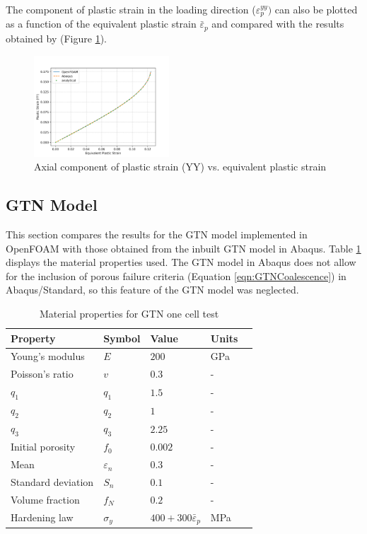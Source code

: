 \documentclass[sn-mathphys,Numbered]{sn-jnl}%
\begin{document}
\begin{appendices}
The component of plastic strain in the loading direction ($\varepsilon_p^{yy})$ can also be plotted as a function of the equivalent plastic strain ${\bar{\varepsilon}}_p$ and compared with the results obtained by \citet{doghri_numerical_1995} (Figure \ref{fig:lemaitre_one_element_ep}).
\begin{figure}[htbp]
\begin{center}
	\includegraphics[width=0.45\textwidth]{./figures/finiteVolumeImplementation/plasticStrainMult.png}
	\caption{Axial component of plastic strain (YY) vs. equivalent plastic strain}
	\label{fig:lemaitre_one_element_ep}
\end{center}
\end{figure}


\subsection{GTN Model}
This section compares the results for the GTN model implemented in OpenFOAM with those obtained from the inbuilt GTN model in Abaqus.
Table \ref{tab:material_properties_GTN_one_elem} displays the material properties used.
The GTN model in Abaqus does not allow for the inclusion of porous failure criteria (Equation \ref{eqn:GTNCoalescence}) in Abaqus/Standard, so this feature of the GTN model was neglected. 
\begin{table}[htb]
	\centering
		\begin{tabular}{lllll} \hline
			Property & Symbol & Value & Units  \\ \hline 
			Young's modulus & $E$ & $200$ & GPa \\
			Poisson's ratio & $v$ & $0.3$ &-   \\
			$q_1$ & $q_1$ & $1.5$  &- \\
		    $q_2$ & $q_2$ & $1$ &-  \\
		    $q_3$ & $q_3$ & $2.25$ &-  \\
		    Initial porosity & $f_0$ & $0.002$ &-  \\
		    Mean & $\varepsilon_n$ & $0.3$  &- \\
		    Standard deviation & $S_n$ & $0.1$ &-  \\
		    Volume fraction & $f_N$ & $0.2$  &- \\
			Hardening law & $\sigma_y$ & $400+300{\bar{\varepsilon}}_p$  & MPa  \\
			\hline
		\end{tabular}
	\caption{Material properties for GTN one cell test}
	\label{tab:material_properties_GTN_one_elem}
\end{table}


\end{appendices}
\end{document}

